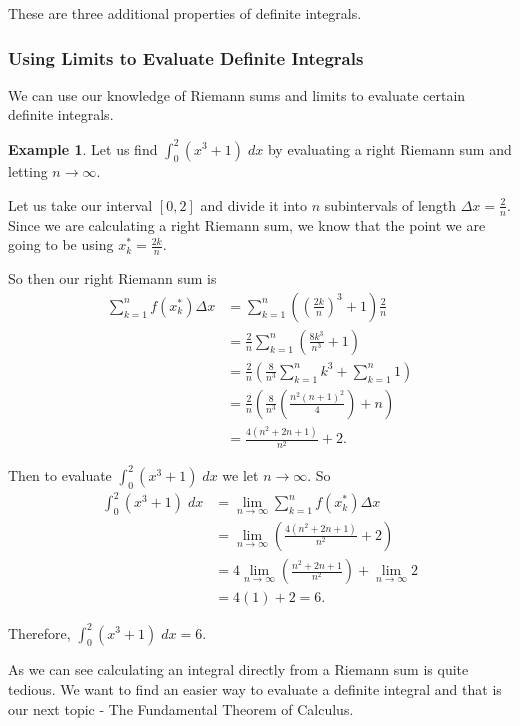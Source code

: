 \documentclass[12pt,reqno]{article}
\theoremstyle{definition}
\newtheorem*{Example}{Example}
\begin{document}
These are three additional properties of definite integrals. 
\subsubsection{Using Limits to Evaluate Definite Integrals} 

We can use our knowledge of Riemann sums and limits to evaluate certain definite integrals. 

\begin{Example}
	Let us find $\int_{0}^{2} (x^3 + 1) \; dx$ by evaluating a right Riemann sum and letting $n \to \infty$. 
	
	Let us take our interval $[0, 2]$ and divide it into $n$ subintervals of length $\Delta x = \frac{2}{n}$. Since we are calculating a right Riemann sum, we know that the point we are going to be using $x_{k}^* = \frac{2k}{n}$. 
	
	So then our right Riemann sum is 
	\begin{align*}
		\sum_{k = 1}^{n} f(x_{k}^{*}) \Delta x &= \sum_{k = 1}^{n} \left(\left(\frac{2k}{n}\right)^3 + 1 \right) \frac{2}{n} \\
		&= \frac{2}{n} \sum_{k = 1}^{n} \left(\frac{8 k^3}{n^3} + 1 \right) \\
		&= \frac{2}{n} \left(\frac{8}{n^3} \sum_{k = 1}^{n} k^3 + \sum_{k = 1}^{n} 1 \right) \\
		&= \frac{2}{n} \left(\frac{8}{n^3} \left(\frac{n^2 (n + 1)^2}{4}\right) + n\right) \\
		&= \frac{4(n^2 + 2n + 1)}{n^2} + 2.
	\end{align*}

	Then to evaluate $\int_{0}^{2} (x^3 + 1) \; dx$ we let $n \to \infty$. 
	So
	\begin{align*}
		\int_{0}^{2} (x^3 + 1) \; dx &= \lim_{n \to \infty} \sum_{k = 1}^{n} f(x_{k}^*) \Delta x \\
		&= \lim_{n \to \infty} \left(\frac{4(n^2 + 2n + 1)}{n^2} + 2 \right) \\
		&= 4 \lim_{n \to \infty} \left(\frac{n^2 + 2n + 1}{n^2} \right) + \lim_{n \to \infty} 2 \\
		&= 4(1) + 2 = 6.
	\end{align*}

Therefore, $\int_{0}^{2} (x^3 + 1)\; dx = 6$. 
\end{Example}


As we can see calculating an integral directly from a Riemann sum is quite tedious. We want to find an easier way to evaluate a definite integral and that is our next topic - The Fundamental Theorem of Calculus. 
\end{document}
